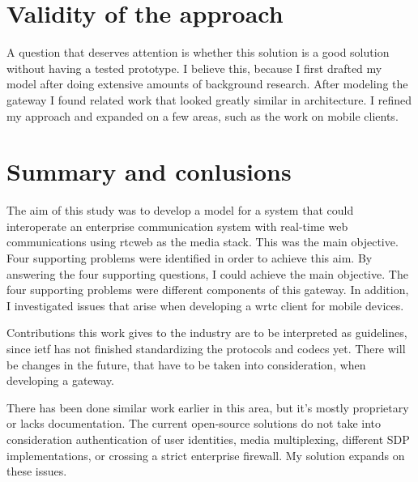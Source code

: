 \section{Validity of the approach}
A question that deserves attention is whether this solution is a good solution without having a tested prototype. I believe this, because I first drafted my model after doing extensive amounts of background research. After modeling the gateway I found related work that looked greatly similar in architecture. I refined my approach and expanded on a few areas, such as the work on mobile clients.

\section{Summary and conlusions}
The aim of this study was to develop a model for a system that could interoperate an enterprise communication system with real-time web communications using \gls{rtcweb} as the media stack. This was the main objective. Four supporting problems were identified in order to achieve this aim. By answering the four supporting questions, I could achieve the main objective. The four supporting problems were different components of this gateway. In addition, I investigated issues that arise when developing a \gls{wrtc} client for mobile devices.

Contributions this work gives to the industry are to be interpreted as guidelines, since \gls{ietf} has not finished standardizing the protocols and codecs yet. There will be changes in the future, that have to be taken into consideration, when developing a gateway.

There has been done similar work earlier in this area, but it's mostly proprietary or lacks documentation. The current open-source solutions do not take into consideration authentication of user identities, media multiplexing, different SDP implementations, or crossing a strict enterprise firewall. My solution expands on these issues.

